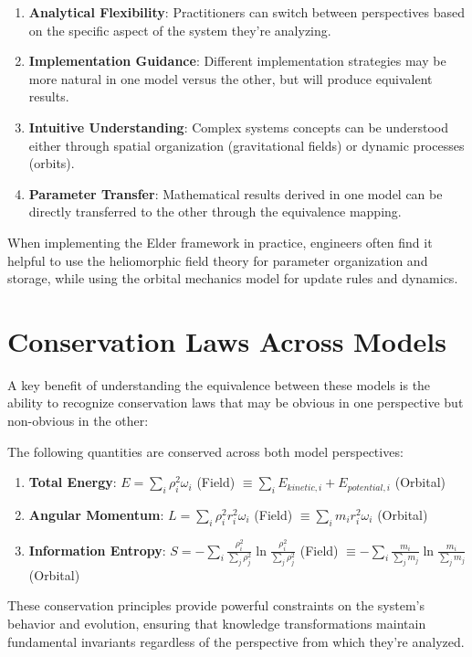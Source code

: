 \begin{enumerate}
    \item \textbf{Analytical Flexibility}: Practitioners can switch between perspectives based on the specific aspect of the system they're analyzing.
    
    \item \textbf{Implementation Guidance}: Different implementation strategies may be more natural in one model versus the other, but will produce equivalent results.
    
    \item \textbf{Intuitive Understanding}: Complex systems concepts can be understood either through spatial organization (gravitational fields) or dynamic processes (orbits).
    
    \item \textbf{Parameter Transfer}: Mathematical results derived in one model can be directly transferred to the other through the equivalence mapping.
\end{enumerate}

\begin{observation}
When implementing the Elder framework in practice, engineers often find it helpful to use the heliomorphic field theory for parameter organization and storage, while using the orbital mechanics model for update rules and dynamics.
\end{observation}

\section{Conservation Laws Across Models}

A key benefit of understanding the equivalence between these models is the ability to recognize conservation laws that may be obvious in one perspective but non-obvious in the other:

\begin{theorem}
The following quantities are conserved across both model perspectives:
\begin{enumerate}
    \item \textbf{Total Energy}: $E = \sum_i \rho_i^2\omega_i$ (Field) $\equiv \sum_i E_{kinetic,i} + E_{potential,i}$ (Orbital)
    
    \item \textbf{Angular Momentum}: $L = \sum_i \rho_i^2 r_i^2 \omega_i$ (Field) $\equiv \sum_i m_i r_i^2 \omega_i$ (Orbital)
    
    \item \textbf{Information Entropy}: $S = -\sum_i \frac{\rho_i^2}{\sum_j \rho_j^2}\ln\frac{\rho_i^2}{\sum_j \rho_j^2}$ (Field) $\equiv -\sum_i \frac{m_i}{\sum_j m_j}\ln\frac{m_i}{\sum_j m_j}$ (Orbital)
\end{enumerate}
\end{theorem}

These conservation principles provide powerful constraints on the system's behavior and evolution, ensuring that knowledge transformations maintain fundamental invariants regardless of the perspective from which they're analyzed.